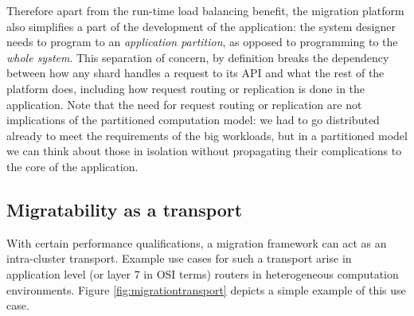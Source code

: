 Therefore apart from the run-time load balancing benefit, the
    migration platform also simplifies a part of the development of the
    application: the system designer needs to program to an
    \emph{application partition}, as opposed to programming to the
    \emph{whole system}. This separation of concern,
    by definition breaks the dependency between how
    any shard handles a request to its API and what the rest of the
    platform does, including how request routing or replication is done
    in the application. Note that the need for request routing or
    replication are not implications of the partitioned computation
    model: we had to go distributed already to meet the requirements of
    the big workloads, but in a partitioned model we can think about those
    in isolation without propagating their complications to the
    core of the application.


\subsection{Migratability as a transport}
With certain performance qualifications, a migration framework can act as
an intra-cluster transport. Example use cases for such a transport arise
in application level (or layer 7 in OSI terms) routers in heterogeneous
computation environments. Figure \ref{fig:migrationtransport} depicts
a simple example of this use case. 

